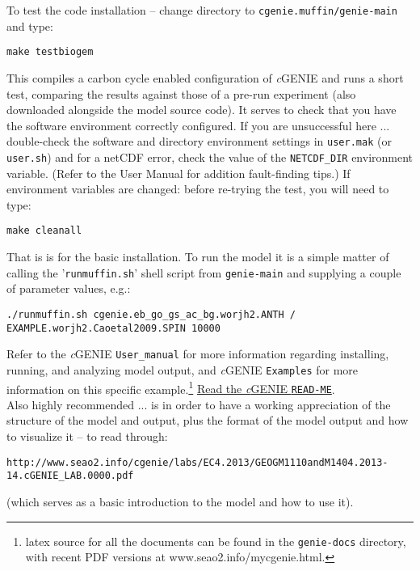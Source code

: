 \documentclass[10pt,twoside]{article}
\begin{document}
\begin{compactenum}
\item   To test the code installation -- change directory to \texttt{cgenie.muffin/genie-main} and type:
\vspace{-5pt}\begin{verbatim}
make testbiogem
\end{verbatim}\vspace{-5pt}
This compiles a carbon cycle enabled configuration of \textit{c}GENIE and runs a short test, comparing the results against those of a pre-run experiment (also downloaded alongside the model source code). It serves to check that you have the software environment correctly configured. If you are unsuccessful here ... double-check the software and directory environment settings in \texttt{user.mak} (or \texttt{user.sh}) and for a netCDF error, check the value of the \texttt{NETCDF\_DIR} environment variable. (Refer to the User Manual for addition fault-finding tips.) If environment variables are changed: before re-trying the test, you will need to type:
\vspace{-5pt}\begin{verbatim}
make cleanall
\end{verbatim}\vspace{-5pt}

\end{compactenum}

\noindent That is is for the basic installation. To run the model it is a simple matter of calling the  '\texttt{runmuffin.sh}'  shell script from \texttt{genie-main} and supplying a couple of parameter values, e.g.:
\vspace{-5pt}\small\begin{verbatim}./runmuffin.sh cgenie.eb_go_gs_ac_bg.worjh2.ANTH / EXAMPLE.worjh2.Caoetal2009.SPIN 10000\end{verbatim}\normalsize\vspace{-5pt}
Refer to the \textit{c}GENIE \texttt{User\_manual} for more information regarding installing, running, and analyzing model output, and \textit{c}GENIE \texttt{Examples} for more information on this specific example.\footnote{latex source for all the documents can be found in the \texttt{genie-docs} directory, with recent PDF versions at www.seao2.info/mycgenie.html.} \uline{Read the \textit{c}GENIE \texttt{READ-ME}}.
\\Also highly recommended ... is in order to have a working appreciation of the structure of the model and output, plus the format of the model output and how to visualize it -- to read through:
\small\vspace{-5pt}\begin{verbatim}
http://www.seao2.info/cgenie/labs/EC4.2013/GEOGM1110andM1404.2013-14.cGENIE_LAB.0000.pdf
\end{verbatim}\vspace{-5pt}\normalsize
(which serves as a basic introduction to the model and how to use it).
\end{document}
